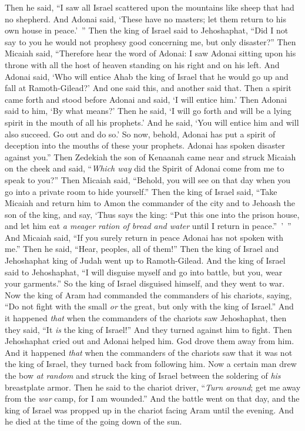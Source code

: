 \begin{biblechapter}
\verse Then he said, “I saw all Israel scattered upon the mountains like sheep that had no shepherd. And Adonai said, ‘These have no masters; let them return to his own house in peace.’ ”
\verse Then the king of Israel said to Jehoshaphat, “Did I not say to you he would not prophesy good concerning me, but only disaster?”
\verse Then Micaiah said, “Therefore hear the word of Adonai: I saw Adonai sitting upon his throne with all the host of heaven standing on his right and on his left.
\verse And Adonai said, ‘Who will entice Ahab the king of Israel that he would go up and fall at Ramoth-Gilead?’ And one said this, and another said that.
\verse Then a spirit came forth and stood before Adonai and said, ‘I will entice him.’ Then Adonai said to him, ‘By what means?’
\verse Then he said, ‘I will go forth and will be a lying spirit in the mouth of all his prophets.’ And he said, ‘You will entice him and will also succeed. Go out and do so.’
\verse So now, behold, Adonai has put a spirit of deception into the mouths of these your prophets. Adonai has spoken disaster against you.”
\verse Then Zedekiah the son of Kenaanah came near and struck Micaiah on the cheek and said, “\textit{Which way} did the Spirit of Adonai come from me to speak to you?”
\verse Then Micaiah said, “Behold, you will see on that day when you go into a private room to hide yourself.”
\verse Then the king of Israel said, “Take Micaiah and return him to Amon the commander of the city and to Jehoash the son of the king,
\verse and say, ‘Thus says the king: “Put this one into the prison house, and let him eat \textit{a meager ration of bread and water} until I return in peace.” ’ ”
\verse And Micaiah said, “If you surely return in peace Adonai has not spoken with me.” Then he said, “Hear, peoples, all of them!”
 Then the king of Israel and Jehoshaphat king of Judah went up to Ramoth-Gilead.
\verse And the king of Israel said to Jehoshaphat, “I will disguise myself and go into battle, but you, wear your garments.” So the king of Israel disguised himself, and they went to war.
\verse Now the king of Aram had commanded the commanders of his chariots, saying, “Do not fight with the small \textit{or} the great, but only with the king of Israel.”
\verse And it happened \textit{that} when the commanders of the chariots saw Jehoshaphat, then they said, “It \textit{is} the king of Israel!” And they turned against him to fight. Then Jehoshaphat cried out and Adonai helped him. God drove them away from him.
\verse And it happened \textit{that} when the commanders of the chariots saw that it was not the king of Israel, they turned back from following him.
\verse Now a certain man drew the bow \textit{at random} and struck the king of Israel between the soldering of \textit{his} breastplate armor. Then he said to the chariot driver, “\textit{Turn around}; get me away from the \textit{war} camp, for I am wounded.”
\verse And the battle went on that day, and the king of Israel was propped up in the chariot facing Aram until the evening. And he died at the time of the going down of the sun.
\end{biblechapter}

